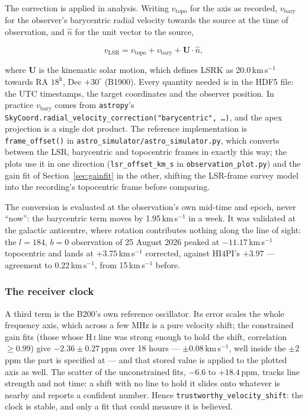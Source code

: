 \documentclass[11pt,a4paper]{article}
\begin{document}
The correction is applied in analysis. Writing $v_\text{topo}$ for the axis as recorded, $v_\text{bary}$ for the observer's barycentric radial velocity towards the source at the time of observation, and $\hat{n}$ for the unit vector to the source,

\begin{equation}
v_\text{LSR} = v_\text{topo} + v_\text{bary} + \mathbf{U}\cdot\hat{n},
\end{equation}

where $\mathbf{U}$ is the kinematic solar motion, which defines LSRK as 20.0\,km\,s$^{-1}$ towards RA $18^\text{h}$, Dec $+30^\circ$ (B1900). Every quantity needed is in the HDF5 file: the UTC timestamps, the target coordinates and the observer position. In practice $v_\text{bary}$ comes from \texttt{astropy}'s \texttt{SkyCoord.radial\_velocity\_correction("barycentric", \ldots)}, and the apex projection is a single dot product. The reference implementation is \texttt{frame\_offset()} in \texttt{astro\_simulator/astro\_simulator.py}, which converts between the LSR, barycentric and topocentric frames in exactly this way; the plots use it in one direction (\texttt{lsr\_offset\_km\_s} in \texttt{observation\_plot.py}) and the gain fit of Section~\ref{sec:gainfit} in the other, shifting the LSR-frame survey model into the recording's topocentric frame before comparing.

The conversion is evaluated at the observation's own mid-time and epoch, never ``now'': the barycentric term moves by 1.95\,km\,s$^{-1}$ in a week. It was validated at the galactic anticentre, where rotation contributes nothing along the line of sight: the $l=184$, $b=0$ observation of 25 August 2026 peaked at $-11.17$\,km\,s$^{-1}$ topocentric and lands at $+3.75$\,km\,s$^{-1}$ corrected, against HI4PI's $+3.97$ --- agreement to 0.22\,km\,s$^{-1}$, from 15\,km\,s$^{-1}$ before.

\subsubsection{The receiver clock}

A third term is the B200's own reference oscillator. Its error scales the whole frequency axis, which across a few MHz is a pure velocity shift; the constrained gain fits (those whose H\,\textsc{i} line was strong enough to hold the shift, correlation $\ge 0.99$) give $-2.36 \pm 0.27$\,ppm over 18 hours --- $\pm 0.08$\,km\,s$^{-1}$, well inside the $\pm 2$\,ppm the part is specified at --- and that stored value is applied to the plotted axis as well. The scatter of the unconstrained fits, $-6.6$ to $+18.4$\,ppm, tracks line strength and not time: a shift with no line to hold it slides onto whatever is nearby and reports a confident number. Hence \texttt{trustworthy\_velocity\_shift}: the clock is stable, and only a fit that could measure it is believed.
\end{document}
